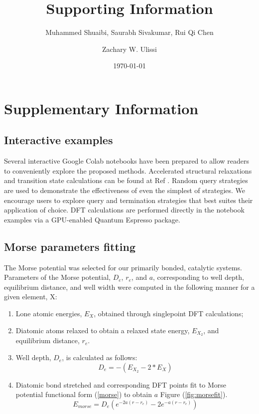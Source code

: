 \documentclass[%
 reprint,
 amsmath,amssymb,
 aps,
]{revtex4-2}
\begin{document}
\title{Supporting Information}

\author{Muhammed Shuaibi, Saurabh Sivakumar, Rui Qi Chen}
\author{Zachary W. Ulissi}%
%

\date{\today}
            
             
\section{Supplementary Information}
\renewcommand{\theequation}{S.\arabic{equation}}
\renewcommand\thefigure{S.\arabic{figure}}
\setcounter{figure}{0}  
\setcounter{equation}{0}  
\subsection{Interactive examples}
Several interactive Google Colab notebooks have been prepared to allow readers to conveniently explore the proposed methods. Accelerated structural relaxations and transition state calculations can be found at Ref \cite{examples}. Random query strategies are used to demonstrate the effectiveness of even the simplest of strategies. We encourage users to explore query and termination strategies that best suites their application of choice. DFT calculations are performed directly in the notebook examples via a GPU-enabled Quantum Espresso package.

\subsection{Morse parameters fitting}
The Morse potential was selected for our primarily bonded, catalytic systems. Parameters of the Morse potential, $D_e$, $r_e$, and $a$, corresponding to well depth, equilibrium distance, and well width were computed in the following manner for a given element, X:
\begin{enumerate}
    \item Lone atomic energies, $E_X$, obtained through singlepoint DFT calculations;
    \item Diatomic atoms relaxed to obtain a relaxed state energy, $E_{X_2}$, and equilibrium distance, $r_e$.
    \item Well depth, $D_e$, is calculated as follows:
    \begin{equation}
        D_e = -(E_{X_2} - 2 * E_X)
    \end{equation}
    \item Diatomic bond stretched and corresponding DFT points fit to Morse potential functional form (\ref{morse}) to obtain $a$ Figure (\ref{fig:morsefit}).
    \begin{equation}\label{morse}
    E_{morse} = D_e(e^{-2a(r-r_e)} - 2e^{-a(r-r_e)})
    \end{equation}
\end{enumerate}
 
\end{document}
